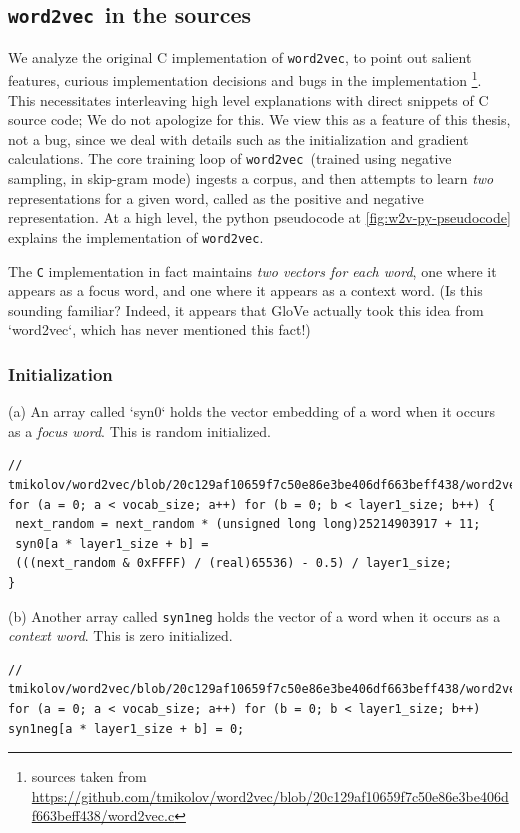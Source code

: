 \documentclass[11pt]{book}
\newcommand{\wtov}{\texttt{word2vec }}
\begin{document}
\subsection{\wtov in the sources}

We analyze the original C implementation of \texttt{word2vec}, to point out
salient features, curious implementation decisions and bugs in the
implementation
\footnote{sources taken from \url{https://github.com/tmikolov/word2vec/blob/20c129af10659f7c50e86e3be406df663beff438/word2vec.c}}.
This necessitates interleaving high level explanations with direct snippets of  C source code;
We do not apologize for this. We view this as a feature of this thesis, not a bug, since we deal
with details such as the initialization and gradient calculations.  The core
training loop of \wtov (trained using negative sampling, in skip-gram mode)
ingests a corpus, and then attempts to learn \emph{two} representations for a
given word, called as the positive and negative representation. At a high
level, the python pseudocode at \autoref{fig:w2v-py-pseudocode} explains the
implementation of \texttt{word2vec}.

The \texttt{C} implementation in fact maintains \emph{two vectors for each word}, one where
it appears as a focus word, and one where it appears as a context word.
(Is this sounding familiar? Indeed, it appears that GloVe actually took this
idea from `word2vec`, which has never mentioned this fact!)

\subsubsection{Initialization}
(a) An array called `syn0` holds the vector embedding of a word when it occurs
as a \emph{focus word}. This is random initialized.

\begin{verbatim}
// tmikolov/word2vec/blob/20c129af10659f7c50e86e3be406df663beff438/word2vec.c#L369
for (a = 0; a < vocab_size; a++) for (b = 0; b < layer1_size; b++) {
 next_random = next_random * (unsigned long long)25214903917 + 11;
 syn0[a * layer1_size + b] =
 (((next_random & 0xFFFF) / (real)65536) - 0.5) / layer1_size;
}
\end{verbatim}

(b) Another array called \texttt{syn1neg} holds the vector of a word when it occurs
as a \emph{context word}. This is zero initialized.

\begin{verbatim}
// tmikolov/word2vec/blob/20c129af10659f7c50e86e3be406df663beff438/word2vec.c#L365
for (a = 0; a < vocab_size; a++) for (b = 0; b < layer1_size; b++)
syn1neg[a * layer1_size + b] = 0;
\end{verbatim}
\end{document}
